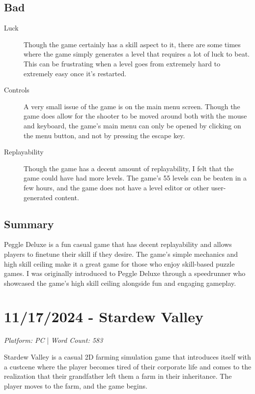 \documentclass{article}
\begin{document}
\subsection{Bad}
\begin{description}
      \item[Luck] Though the game certainly has a skill aspect to it, there are
            some times where the game simply generates a level that requires a lot of
            luck to beat. This can be frustrating when a level goes from extremely
            hard to extremely easy once it's restarted.
      \item[Controls] A very small issue of the game is on the main menu screen.
            Though the game does allow for the shooter to be moved around both with
            the mouse and keyboard, the game's main menu can only be opened by
            clicking on the menu button, and not by pressing the escape key.
      \item[Replayability] Though the game has a decent amount of replayability,
            I felt that the game could have had more levels. The game's 55 levels can
            be beaten in a few hours, and the game does not have a level editor or
            other user-generated content.
\end{description}

\subsection{Summary}
Peggle Deluxe is a fun casual game that has decent replayability and allows
players to finetune their skill if they desire. The game's simple mechanics and
high skill ceiling make it a great game for those who enjoy skill-based puzzle
games. I was originally introduced to Peggle Deluxe through a speedrunner who
showcased the game's high skill ceiling alongside fun and engaging gameplay.

\pagebreak

\section{11/17/2024 - Stardew Valley}

\begin{center}
      \textit{Platform: PC} | \textit{Word Count: 583}
\end{center}

Stardew Valley is a casual 2D farming simulation game that introduces itself
with a custcene where the player becomes tired of their corporate life and comes
to the realization that their grandfather left them a farm in their inheritance.
The player moves to the farm, and the game begins.
\end{document}
